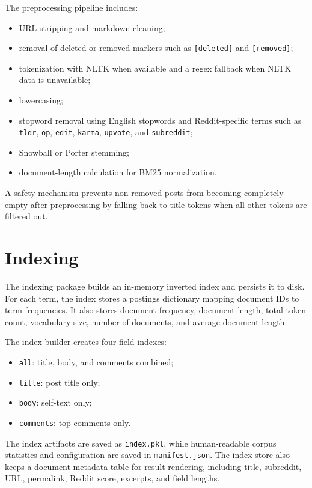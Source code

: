 \documentclass[11pt]{article}
\begin{document}
The preprocessing pipeline includes:

\begin{itemize}
    \item URL stripping and markdown cleaning;
    \item removal of deleted or removed markers such as \texttt{[deleted]} and \texttt{[removed]};
    \item tokenization with NLTK when available and a regex fallback when NLTK data is unavailable;
    \item lowercasing;
    \item stopword removal using English stopwords and Reddit-specific terms such as \texttt{tldr}, \texttt{op}, \texttt{edit}, \texttt{karma}, \texttt{upvote}, and \texttt{subreddit};
    \item Snowball or Porter stemming;
    \item document-length calculation for BM25 normalization.
\end{itemize}

A safety mechanism prevents non-removed posts from becoming completely empty after preprocessing by falling back to title tokens when all other tokens are filtered out.

\section{Indexing}
The indexing package builds an in-memory inverted index and persists it to disk. For each term, the index stores a postings dictionary mapping document IDs to term frequencies. It also stores document frequency, document length, total token count, vocabulary size, number of documents, and average document length.

The index builder creates four field indexes:

\begin{itemize}
    \item \texttt{all}: title, body, and comments combined;
    \item \texttt{title}: post title only;
    \item \texttt{body}: self-text only;
    \item \texttt{comments}: top comments only.
\end{itemize}

The index artifacts are saved as \texttt{index.pkl}, while human-readable corpus statistics and configuration are saved in \texttt{manifest.json}. The index store also keeps a document metadata table for result rendering, including title, subreddit, URL, permalink, Reddit score, excerpts, and field lengths.
\end{document}

